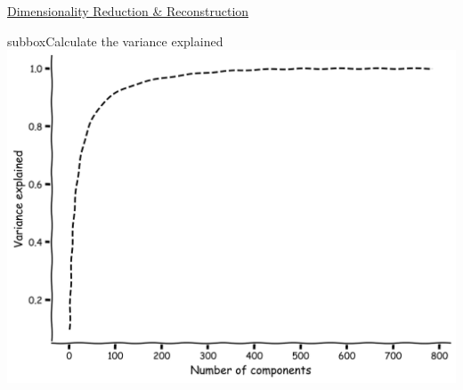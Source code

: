\begin{textbox}{\href{https://compneuro.neuromatch.io/tutorials/W1D4_DimensionalityReduction/student/W1D4_Tutorial3.html}{Dimensionality Reduction \& Reconstruction } }
\begin{subbox}{subbox}{Calculate the variance explained
}
\centering
\includegraphics[scale=0.15]{Figures/DM/DMFigure4.png}

\end{subbox}

\end{textbox}
